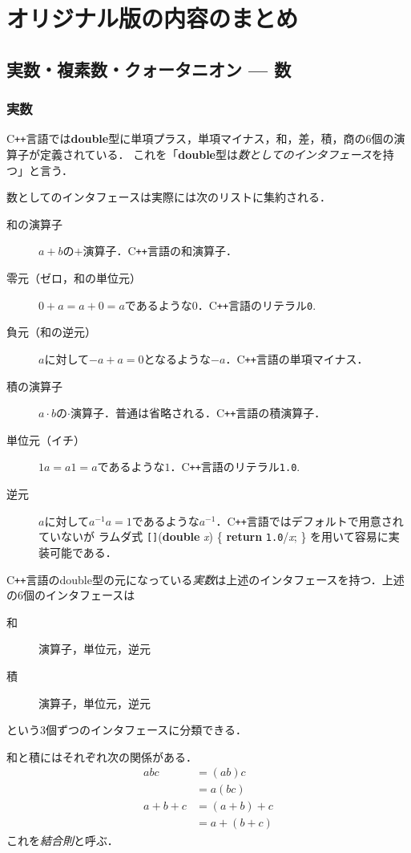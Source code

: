 \documentclass{jsbook}
\newcommand{\cxx}{\textrm{C}\texttt{++}}
\newcommand{\cliteral}[1]{\texttt{#1}}
\newcommand{\ckeyword}[1]{\textbf{#1}}
\newcommand{\cid}[1]{\textit{#1}}
\newcommand{\keyword}[1]{\emph{#1}}
\begin{document}
\chapter{オリジナル版の内容のまとめ}

\section{実数・複素数・クォータニオン --- 数}

\subsection{実数}

\cxx 言語では\ckeyword{double}型に単項プラス，単項マイナス，和，差，積，商の6個の演算子が定義されている．
これを「\ckeyword{double}型は\keyword{数としてのインタフェース}を持つ」と言う．

数としてのインタフェースは実際には次のリストに集約される．
\begin{description}
\item[和の演算子] $a+b$の$+$演算子．\cxx 言語の和演算子．
\item[零元（ゼロ，和の単位元）] $0+a=a+0=a$であるような$0$．\cxx 言語のリテラル\cliteral{0}.
\item[負元（和の逆元）] $a$に対して$-a+a=0$となるような$-a$．\cxx 言語の単項マイナス．
\item[積の演算子] $a\cdot b$の$\cdot$演算子．普通は省略される．\cxx 言語の積演算子．
\item[単位元（イチ）] $1a=a1=a$であるような$1$．\cxx 言語のリテラル\cliteral{1.0}.
\item[逆元] $a$に対して$a^{-1}a=1$であるような$a^{-1}$．\cxx 言語ではデフォルトで用意されていないが
ラムダ式 \texttt{[]}(\ckeyword{double} \cid{x}) \{ \ckeyword{return} \cliteral{1.0}/\cid{x}; \} を用いて容易に実装可能である．
\end{description}
\cxx 言語のdouble型の元になっている\keyword{実数}は上述のインタフェースを持つ．上述の6個のインタフェースは
\begin{description}
\item[和] 演算子，単位元，逆元
\item[積] 演算子，単位元，逆元
\end{description}
という3個ずつのインタフェースに分類できる．

和と積にはそれぞれ次の関係がある．
\begin{align}
abc&=(ab)c\\
  &=a(bc)\\
a+b+c&=(a+b)+c\\
  &=a+(b+c)
\end{align}
これを\keyword{結合則}と呼ぶ．
\end{document}
